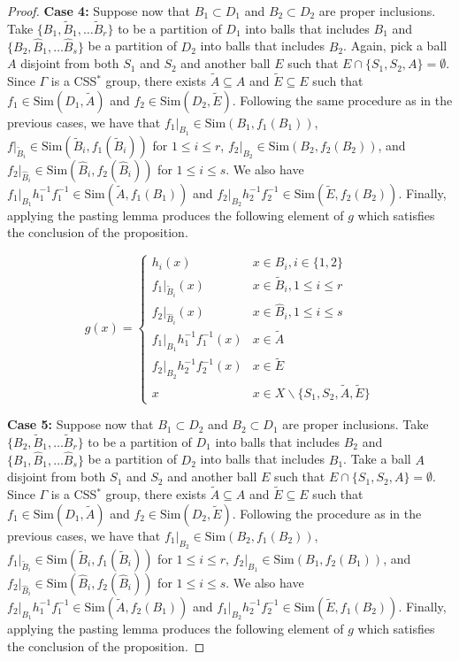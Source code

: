 \documentclass[10pt,a4paper]{amsart}
\begin{document}
\begin{proof}
    \noindent\textbf{Case 4:}
    Suppose now that $B_1 \subset D_1$ and $B_2 \subset D_2$ are proper inclusions. Take $\{B_1, \tilde B_1, \dots \tilde B_r \}$ to be a partition of $D_1$ into balls that includes $B_1$ and $\{B_2, \hat B_1, \dots \hat B_s \}$ be a partition of $D_2$ into balls that includes $B_2$. Again, pick a ball $A$ disjoint from both $S_1$ and $S_2$ and another ball $E$ such that $E \cap \{S_1, S_2, A\} = \emptyset$. Since $\Gamma$ is a CSS$^*$ group, there exists $\tilde A \subseteq A$ and $\tilde E \subseteq E$ such that $f_1 \in \text{Sim}(D_1, \tilde A)$ and $f_2 \in \text{Sim}(D_2, \tilde E)$. Following the same procedure as in the previous cases, we have that $f_1\vert_{B_1} \in \text{Sim}(B_1, f_1(B_1))$,  $f\vert_{\tilde B_i} \in \text{Sim}(\tilde B_i, f_1(\tilde B_i))$ for $1 \leq i \leq r$, $f_2\vert_{B_2} \in \text{Sim}(B_2, f_2(B_2))$, and $f_2\vert_{\hat B_i} \in \text{Sim}(\hat B_i, f_2(\hat B_i))$ for $1 \leq i \leq s$.  We also have $f_1\vert_{B_1}h_1^{-1}f_1^{-1} \in \text{Sim}(\tilde A,f_1(B_1))$ and $f_2\vert_{B_2}h_2^{-1}f_2^{-1} \in \text{Sim}(\tilde E, f_2(B_2))$. Finally, applying the pasting lemma produces the following element of $g$ which satisfies the conclusion of the proposition.  

     \[ g(x) = \begin{cases} h_i(x) & x \in B_i, i\in\{1,2\}  \\
     f_1\vert_{\tilde B_i}(x) & x \in \tilde B_i, 1 \leq i \leq r\\
      f_2\vert_{\hat B_i}(x) & x \in \hat B_i, 1 \leq i \leq s\\
    f_1\vert_{B_1}h_1^{-1}f_1^{-1} (x) & x\in \tilde A\\
    f_2\vert_{B_2}h_2^{-1}f_2^{-1} (x) & x\in \tilde E\\
    x & x \in X \backslash \{S_1, S_2, \tilde A, \tilde E\}
    \end{cases}
    \]
    

    
    \noindent\textbf{Case 5:}
    Suppose now that $B_1 \subset D_2$ and $B_2 \subset D_1$ are proper inclusions.  Take $\{B_2, \tilde B_1, \dots \tilde B_r \}$ to be a partition of $D_1$ into balls that includes $B_2$ and $\{B_1, \hat B_1, \dots \hat B_s \}$ be a partition of $D_2$ into balls that includes $B_1$. Take a ball $A$ disjoint from both $S_1$ and $S_2$ and another ball $E$ such that $E \cap \{S_1, S_2, A\} = \emptyset$. Since $\Gamma$ is a CSS$^*$ group, there exists $\tilde A \subseteq A$ and $\tilde E \subseteq E$ such that $f_1 \in \text{Sim}(D_1, \tilde A)$ and $f_2 \in \text{Sim}(D_2, \tilde E)$. Following the procedure as in the previous cases, we have that $f_1\vert_{B_2} \in \text{Sim}(B_2, f_1(B_2))$,  $f_1\vert_{\tilde B_i} \in \text{Sim}(\tilde B_i, f_1(\tilde B_i))$ for $1 \leq i \leq r$, $f_2\vert_{B_1} \in \text{Sim}(B_1, f_2(B_1))$, and $f_2\vert_{\hat B_i} \in \text{Sim}(\hat B_i, f_2(\hat B_i))$ for $1 \leq i \leq s$.  We also have $f_2\vert_{B_1}h_1^{-1}f_1^{-1} \in \text{Sim}(\tilde A,f_2(B_1))$ and $f_1\vert_{B_2}h_2^{-1}f_2^{-1} \in \text{Sim}(\tilde E, f_1(B_2))$. Finally, applying the pasting lemma produces the following element of $g$ which satisfies the conclusion of the proposition.  


\end{proof}
\end{document}
